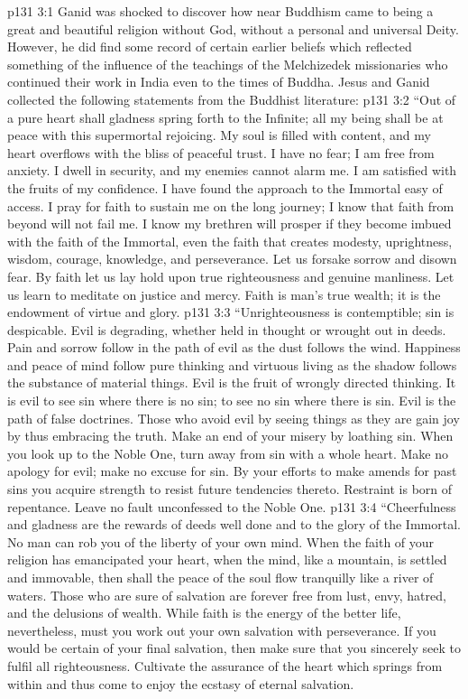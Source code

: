 \vs p131 3:1 Ganid was shocked to discover how near Buddhism came to being a great and beautiful religion without God, without a personal and universal Deity. However, he did find some record of certain earlier beliefs which reflected something of the influence of the teachings of the Melchizedek missionaries who continued their work in India even to the times of Buddha. Jesus and Ganid collected the following statements from the Buddhist literature:
\vs p131 3:2 \pc “Out of a pure heart shall gladness spring forth to the Infinite; all my being shall be at peace with this supermortal rejoicing. My soul is filled with content, and my heart overflows with the bliss of peaceful trust. I have no fear; I am free from anxiety. I dwell in security, and my enemies cannot alarm me. I am satisfied with the fruits of my confidence. I have found the approach to the Immortal easy of access. I pray for faith to sustain me on the long journey; I know that faith from beyond will not fail me. I know my brethren will prosper if they become imbued with the faith of the Immortal, even the faith that creates modesty, uprightness, wisdom, courage, knowledge, and perseverance. Let us forsake sorrow and disown fear. By faith let us lay hold upon true righteousness and genuine manliness. Let us learn to meditate on justice and mercy. Faith is man’s true wealth; it is the endowment of virtue and glory.
\vs p131 3:3 “Unrighteousness is contemptible; sin is despicable. Evil is degrading, whether held in thought or wrought out in deeds. Pain and sorrow follow in the path of evil as the dust follows the wind. Happiness and peace of mind follow pure thinking and virtuous living as the shadow follows the substance of material things. Evil is the fruit of wrongly directed thinking. It is evil to see sin where there is no sin; to see no sin where there is sin. Evil is the path of false doctrines. Those who avoid evil by seeing things as they are gain joy by thus embracing the truth. Make an end of your misery by loathing sin. When you look up to the Noble One, turn away from sin with a whole heart. Make no apology for evil; make no excuse for sin. By your efforts to make amends for past sins you acquire strength to resist future tendencies thereto. Restraint is born of repentance. Leave no fault unconfessed to the Noble One.
\vs p131 3:4 “Cheerfulness and gladness are the rewards of deeds well done and to the glory of the Immortal. No man can rob you of the liberty of your own mind. When the faith of your religion has emancipated your heart, when the mind, like a mountain, is settled and immovable, then shall the peace of the soul flow tranquilly like a river of waters. Those who are sure of salvation are forever free from lust, envy, hatred, and the delusions of wealth. While faith is the energy of the better life, nevertheless, must you work out your own salvation with perseverance. If you would be certain of your final salvation, then make sure that you sincerely seek to fulfil all righteousness. Cultivate the assurance of the heart which springs from within and thus come to enjoy the ecstasy of eternal salvation.
